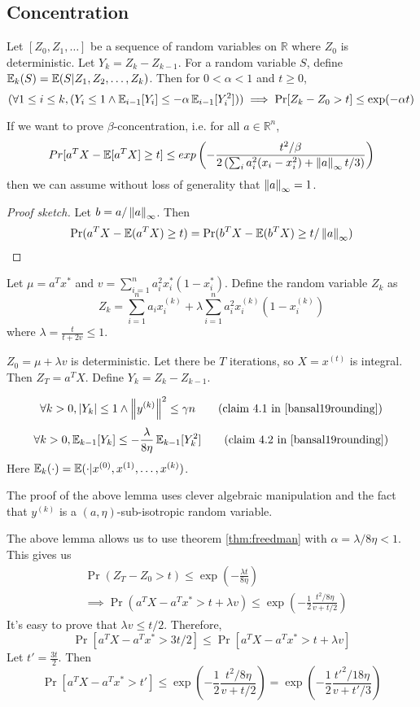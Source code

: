 \subsection{Concentration}

\begin{theorem}
\label{thm:freedman}
Let $[Z_0, Z_1, \ldots]$ be a sequence of random variables on $\mathbb{R}$
where $Z_0$ is deterministic. Let $Y_k = Z_k - Z_{k-1}$.
For a random variable $S$, define $\operatorname{\mathbb{E}}_k(S) = \operatorname{\mathbb{E}}(S | Z_1, Z_2, \ldots, Z_k)$.
Then for $0 < \alpha < 1$ and $t \ge 0$,
\[ (\forall 1 \le i \le k, (Y_i \le 1 \wedge \operatorname{\mathbb{E}}_{i-1}[Y_i] \le -\alpha\operatorname{\mathbb{E}}_{i-1}[Y_i^2]))
\implies \Pr[Z_k - Z_0 > t] \le \exp(-\alpha t) \]
\end{theorem}

\begin{lemma}
If we want to prove $\beta$-concentration, i.e. for all $a \in \mathbb{R}^n$,
\[ Pr[a^T X - \operatorname{\mathbb{E}}[a^T X] \ge t] \leq exp\left(-\frac{t^2/\beta}{
2\left(\sum_i a_i^2(x_i - x_i^2) + \left\lVert a \right\rVert_{\infty}t/3\right)}\right) \]
then we can assume without loss of generality that $\left\lVert a \right\rVert_{\infty} = 1$.
\end{lemma}
\begin{proof}[Proof sketch]
Let $b = a/\left\lVert a \right\rVert_{\infty}$. Then
\[ \Pr(a^TX - \operatorname{\mathbb{E}}(a^TX) \ge t) = \Pr(b^TX - \operatorname{\mathbb{E}}(b^TX) \ge t/\left\lVert a \right\rVert_{\infty}) \]
\end{proof}

Let $\mu = a^Tx^*$ and $v = \sum_{i=1}^n a_i^2x_i^*(1-x_i^*)$.
Define the random variable $Z_k$ as
\[ Z_k = \sum_{i=1}^n a_ix^{(k)}_i + \lambda\sum_{i=1}^n a_i^2x^{(k)}_i(1-x^{(k)}_i) \]
where $\lambda = \frac{t}{t+2v} \le 1$.

$Z_0 = \mu + \lambda v$ is deterministic.
Let there be $T$ iterations, so $X = x^{(t)}$ is integral.
Then $Z_T = a^TX$. Define $Y_k = Z_k - Z_{k-1}$.

\begin{lemma}
\[ \forall k > 0, \abs{Y_k} \le 1 \wedge \norm{y^{(k)}}^2 \le \gamma n
\tag{claim 4.1 in \cite{bansal19rounding}} \]
\[ \forall k > 0, \E_{k-1}[Y_k] \le -\frac{\lambda}{8\eta} \E_{k-1}[Y_k^2]
\tag{claim 4.2 in \cite{bansal19rounding}} \]
Here $\operatorname{\mathbb{E}}_k(\cdot) = \operatorname{\mathbb{E}}(\cdot | x^{(0)}, x^{(1)}, \ldots, x^{(k)})$.
\end{lemma}
The proof of the above lemma uses clever algebraic manipulation
and the fact that $y^{(k)}$ is a $(a, \eta)$-sub-isotropic random variable.

The above lemma allows us to use theorem \ref{thm:freedman}
with $\alpha = \lambda/8\eta < 1$. This gives us
\begin{align*}
& \Pr(Z_T - Z_0 > t) \le \exp\left(-\frac{\lambda t}{8\eta} \right)
\\ &\implies \Pr(a^TX - a^Tx^* > t + \lambda v)
\le \exp\left(-\frac{1}{2} \frac{t^2/8\eta}{v + t/2} \right)
\end{align*}
It's easy to prove that $\lambda v \le t/2$. Therefore,
\[ \Pr[a^TX - a^Tx^* > 3t/2] \le \Pr[a^TX - a^Tx^* > t + \lambda v] \]
Let $t' = \frac{3t}{2}$. Then
\[ \Pr[a^TX - a^Tx^* > t']
\le \exp\left(-\frac{1}{2} \frac{t^2/8\eta}{v + t/2} \right)
= \exp\left(-\frac{1}{2} \frac{{t'}^2/18\eta}{v + t'/3} \right) \]

